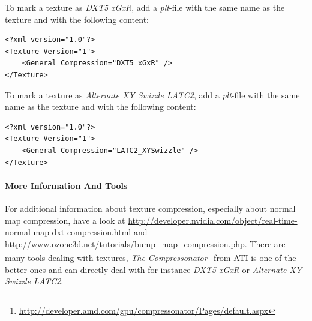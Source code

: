To mark a texture as \emph{DXT5 xGxR}, add a \emph{plt}-file with the same name as the texture and with the following content:
\begin{lstlisting}[caption=\emph{plt}-file \emph{DXT5 xGxR} normal map compression]
<?xml version="1.0"?>
<Texture Version="1">
    <General Compression="DXT5_xGxR" />
</Texture>
\end{lstlisting}

To mark a texture as \emph{Alternate XY Swizzle LATC2}, add a \emph{plt}-file with the same name as the texture and with the following content:
\begin{lstlisting}[caption=\emph{plt}-file \emph{Alternate XY Swizzle LATC2} normal map compression]
<?xml version="1.0"?>
<Texture Version="1">
    <General Compression="LATC2_XYSwizzle" />
</Texture>
\end{lstlisting}


\paragraph{More Information And Tools}
For additional information about texture compression, especially about normal map compression, have a look at 
\url{http://developer.nvidia.com/object/real-time-normal-map-dxt-compression.html} and \url{http://www.ozone3d.net/tutorials/bump_map_compression.php}.
There are many tools dealing with textures, \emph{The Compressonator}\footnote{\url{http://developer.amd.com/gpu/compressonator/Pages/default.aspx}} from ATI is one of the better ones and can directly deal with for instance \emph{DXT5 xGxR} or \emph{Alternate XY Swizzle LATC2}.
